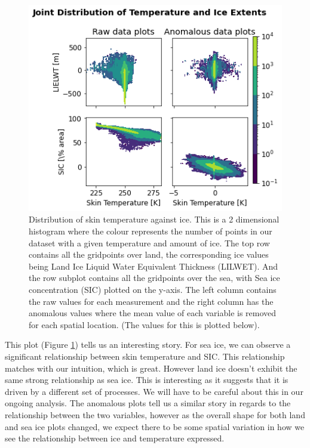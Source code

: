 \documentclass[../main.tex]{subfiles}
\begin{document}
\begin{figure}[h!]
    \centering
    \includegraphics{images/week8/lres/distribution_of_temperature_ice_both_raw_and_anomalous}
    \caption{Distribution of skin temperature against ice. This is a 2 dimensional histogram where the colour represents the number of points in our dataset with a given temperature and amount of ice. The top row contains all the gridpoints over land, the corresponding ice values being Land Ice Liquid Water Equivalent Thickness (LILWET). And the row subplot contains all the gridpoints over the sea, with Sea ice concentration (SIC) plotted on the y-axis. The left column contains the raw values for each measurement and the right column has the anomalous values where the mean value of each variable is removed for each spatial location. (The values for this is plotted below).}
    \label{fig:joint_distribuition_temp_ice}
\end{figure}

This plot (Figure \ref{fig:joint_distribuition_temp_ice}) tells us an interesting story. For sea ice, we can observe a significant relationship between skin temperature and SIC. This relationship matches with our intuition, which is great. However land ice doesn't exhibit the same strong relationship as sea ice. This is interesting as it suggests that it is driven by a different set of processes. We will have to be careful about this in our ongoing analysis. The anomalous plots tell us a similar story in regards to the relationship between the two variables, however as the overall shape for both land and sea ice plots changed, we expect there to be some spatial variation in how we see the relationship between ice and temperature expressed.
\end{document}
